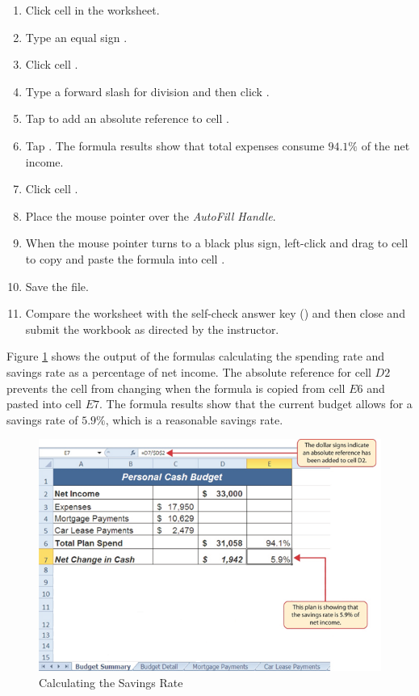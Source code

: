 \begin{enumbox}
	\begin{enumerate}
		\item Click cell  in the  worksheet.
		\item Type an equal sign \fmtTyping{=}.
		\item Click cell .
		\item Type a forward slash \fmtTyping{/} for division and then click .
		\item Tap  to add an absolute reference to cell .
		\item Tap . The formula results show that total expenses consume $ 94.1\% $ of the net income.
		\item Click cell .
		\item Place the mouse pointer over the \textit{AutoFill Handle}.
		\item When the mouse pointer turns to a black plus sign, left-click and drag to cell  to copy and paste the formula into cell .
		\item Save the  file.
		\item Compare the worksheet with the self-check answer key () and then close and submit the  workbook as directed by the instructor.
	\end{enumerate}
\end{enumbox}

Figure \ref{02:fig39} shows the output of the formulas calculating the spending rate and savings rate as a percentage of net income. The absolute reference for cell $ D2 $ prevents the cell from changing when the formula is copied from cell $ E6 $ and pasted into cell $ E7 $. The formula results show that the current budget allows for a savings rate of $ 5.9\% $, which is a reasonable savings rate.

\begin{figure}[H]
	\centering
	\includegraphics[width=\maxwidth{.95\linewidth}]{gfx/ch02_fig39}
	\caption{Calculating the Savings Rate}
	\label{02:fig39}
\end{figure}

